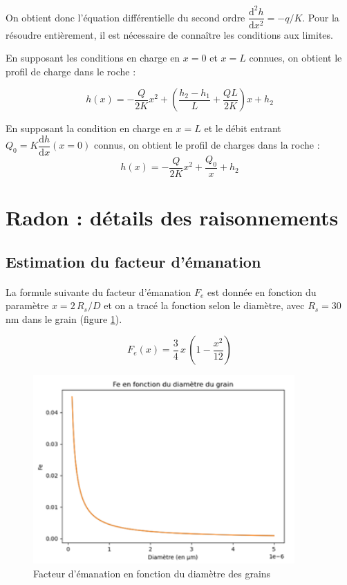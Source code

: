 \documentclass{article}
\begin{document}
On obtient donc l’équation différentielle du second ordre $\dfrac{\text{d}^2h}{\text{d}x^2}=-q/K$. 
Pour la résoudre entièrement, il est nécessaire de connaître les conditions aux limites. 

En supposant les conditions en charge en $x = 0$ et $x = L$ connues, on obtient le profil de charge dans le roche :

$$h(x) = -\frac{Q}{2K}x^2 + \left(\frac{h_2 - h_1}{L} + \frac{QL}{2K}\right)x + h_2$$


En supposant la condition en charge en $x = L$ et le débit entrant $Q_0 = K \dfrac{\text{d}h}{\text{d}x}(x = 0)$ connus, on obtient le profil de charges dans la roche :
$$h(x) = -\frac{Q}{2K}x^2 + \frac{Q_0}x + h_2$$

\newpage
\section{Radon : détails des raisonnements}
\label{annexe:detail_modele_radon_sec}
\subsection{Estimation du facteur d'émanation}
\label{annexe:emanation}

\paragraph{} La formule suivante du facteur d'émanation $F_e$ est donnée en fonction du paramètre $x=2\,R_s/D$ et on a tracé la fonction selon le diamètre, avec $R_s=30$ nm dans le grain (figure \ref{fig:facteur_emanation}).

$$
F_e (x)= \frac{3}{4} \,x\,(1- \frac{x^2}{12} )
$$

\begin{figure}[H]
    \centering
    \includegraphics[width=10cm]{II_A2_2.png}
    \caption{Facteur d’émanation en fonction du diamètre des grains}
    \label{fig:facteur_emanation}
\end{figure}
\end{document}

